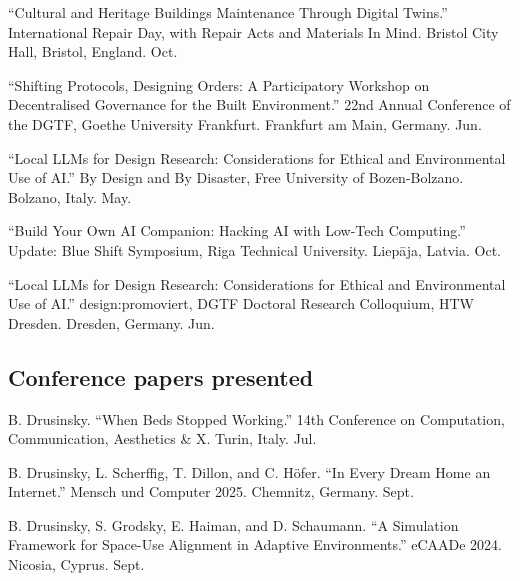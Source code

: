 \documentclass[11pt,letterpaper]{report} %
\begin{document}
\begin{tablist}

\item[2026] \tab{}\enquote{Cultural and Heritage Buildings Maintenance Through Digital Twins.} International Repair Day, with Repair Acts and Materials In Mind. Bristol City Hall, Bristol, England. Oct.

\item[2026] \tab{}\enquote{Shifting Protocols, Designing Orders: A Participatory Workshop on Decentralised Governance for the Built Environment.} 22nd Annual Conference of the DGTF, Goethe University Frankfurt. Frankfurt am Main, Germany. Jun.

\item[2026] \tab{}\enquote{Local LLMs for Design Research: Considerations for Ethical and Environmental Use of AI.} By Design and By Disaster, Free University of Bozen-Bolzano. Bolzano, Italy. May.

\item[2025] \tab{}\enquote{Build Your Own AI Companion: Hacking AI with Low-Tech Computing.} Update: Blue Shift Symposium, Riga Technical University. Liepāja, Latvia. Oct.

\item[2025] \tab{}\enquote{Local LLMs for Design Research: Considerations for Ethical and Environmental Use of AI.} design:promoviert, DGTF Doctoral Research Colloquium, HTW Dresden. Dresden, Germany. Jun.

\end{tablist}

\subsection*{Conference papers presented}

\begin{tablist}

\item[2026] \tab{}B. Drusinsky. \enquote{When Beds Stopped Working.} 14th Conference on Computation, Communication, Aesthetics \& X. Turin, Italy. Jul.

\item[2025] \tab{}B. Drusinsky, L. Scherffig, T. Dillon, and C. Höfer. \enquote{In Every Dream Home an Internet.} Mensch und Computer 2025. Chemnitz, Germany. Sept.

\item[2024] \tab{}B. Drusinsky, S. Grodsky, E. Haiman, and D. Schaumann. \enquote{A Simulation Framework for Space-Use Alignment in Adaptive Environments.} eCAADe 2024. Nicosia, Cyprus. Sept.

\end{tablist}
\end{document}
